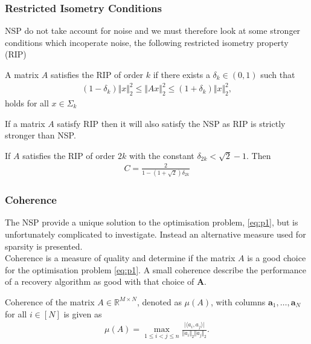 \subsubsection{Restricted Isometry Conditions}
NSP do not take account for noise and we must therefore look at some stronger conditions which incoperate noise, the following restricted isometry property (RIP) %

\begin{definition}
A matrix $A$ satisfies the RIP of order $k$ if there exists a $\delta_k \in (0,1)$ such that
\begin{align*}
(1 - \delta_k) \Vert x \Vert_2^2 \leq \Vert Ax \Vert_2^2 \leq (1 + \delta_k) \Vert x \Vert_2^2,
\end{align*}
holds for all $x \in \Sigma_k$
\end{definition}


If a matrix $A$ satisfy RIP then it will also satisfy the NSP as RIP is strictly stronger than NSP.
\begin{theorem}
If $A$ satisfies the RIP of order $2k$ with the constant $\delta_{2k} < \sqrt{2} -1$. Then
\begin{align*}
C = \frac{2}{1 - (1 + \sqrt{2}) \delta_{2k}}
\end{align*}
\end{theorem} 

\subsubsection{Coherence}
The NSP provide a unique solution to the optimisation problem, \eqref{eq:p1}, but is unfortunately complicated to investigate. Instead an alternative measure used for sparsity is presented.
\\%
Coherence is a measure of quality and determine if the matrix $A$ is a good choice for the optimisation problem \eqref{eq:p1}. A small coherence describe the performance of a recovery algorithm as good with that choice of $\mathbf{A}$. 
\begin{definition}[Coherence]
Coherence of the matrix $A \in \mathbb{R}^{M \times N}$, denoted as $\mu (A)$, with columns $\mathbf{a}_1, \dots, \mathbf{a}_N$ for all $i \in [N]$ is given as
\begin{align*}
\mu (A) = \max_{1 \leq i < j \leq n} \frac{\vert \langle a_i, a_j \rangle \vert}{\Vert a_i \Vert_2 \Vert a_j \Vert_2}.
\end{align*}
\end{definition}


